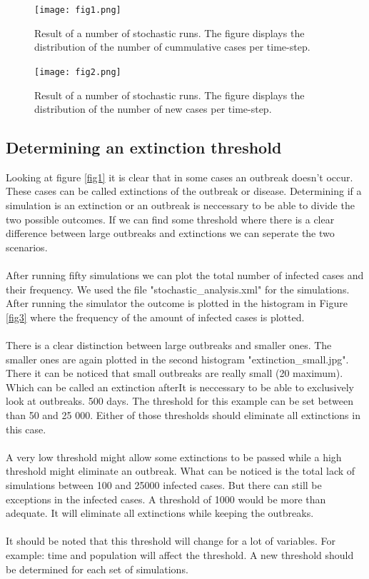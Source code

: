 \documentclass[runningheads]{llncs}
\begin{document}
	\begin{figure}
		\texttt{[image: fig1.png]}
		\caption{Result of a number of stochastic runs. The figure displays the distribution of the number of cummulative cases per time-step.} 	
		\label{fig1}
		
		\texttt{[image: fig2.png]}
		\caption{Result of a number of stochastic runs. The figure displays the distribution of the number of new cases per time-step.} 
		\label{fig2}
	\end{figure} 
	\newpage
	
	
	\subsection{Determining an extinction threshold}
	Looking at figure \ref{fig1} it is clear that in some cases an outbreak doesn't occur. These cases can be called extinctions of the outbreak or disease. Determining if a simulation is an extinction or an outbreak is neccessary to be able to divide the two possible outcomes. If we can find some threshold where there is a clear difference between large outbreaks and extinctions we can seperate the two scenarios.\\ \\
	After running fifty simulations we can plot the total number of infected cases and their frequency.  We used the file "stochastic\_analysis.xml" for the simulations. After running the simulator the outcome is plotted in the histogram in Figure \ref{fig3} where the frequency of the amount of infected cases is plotted.\\ \\
	There is a clear distinction between large outbreaks and smaller ones. The smaller ones are again plotted in the second histogram "extinction\_small.jpg". There it can be noticed that small outbreaks are really small (20 maximum). Which can be called an extinction afterIt is neccessary to be able to exclusively look at outbreaks.  500 days. The threshold for this example can be set between than 50 and 25 000. Either of those thresholds should eliminate all extinctions in this case.\\ \\
	A very low threshold might allow some extinctions to be passed while a high threshold might eliminate an outbreak. What can be noticed is the total lack of simulations between 100 and 25000 infected cases. But there can still be exceptions in the infected cases. A threshold of 1000 would be more than adequate. It will eliminate all extinctions while keeping the outbreaks.\\ \\
	It should be noted that this threshold will change for a lot of variables. For example: time and population will affect the threshold. A new threshold should be determined for each set of simulations.
	
\end{document}
